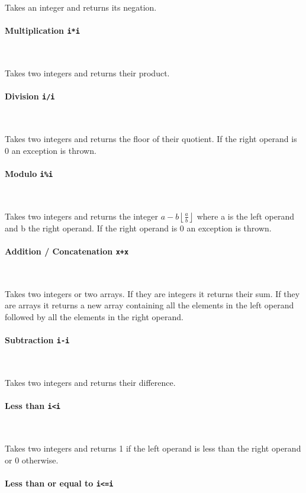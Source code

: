 Takes an integer and returns its negation.

\paragraph{Multiplication \quad \texttt{i*i}} \

Takes two integers and returns their product.

\paragraph{Division \quad \texttt{i/i}} \

Takes two integers and returns the floor of their quotient. If the right operand is 0 an exception is thrown.

\paragraph{Modulo \quad \texttt{i\%i}} \

Takes two integers and returns the integer $ a - b \left\lfloor \frac{a}{b} \right\rfloor $ where a is the left operand and b the right operand. If the right operand is 0 an exception is thrown.

\paragraph{Addition / Concatenation \quad \texttt{x+x}} \

Takes two integers or two arrays. If they are integers it returns their sum. If they are arrays it returns a new array containing all the elements in the left operand followed by all the elements in the right operand.

\paragraph{Subtraction \quad \texttt{i-i}} \

Takes two integers and returns their difference.

\paragraph{Less than \quad \texttt{i<i}} \

Takes two integers and returns 1 if the left operand is less than the right operand or 0 otherwise.

\paragraph{Less than or equal to \quad \texttt{i<=i}} \

